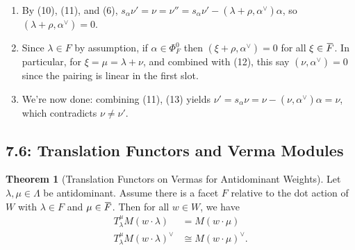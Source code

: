 \documentclass[11pt]{scrartcl}
\theoremstyle{definition}
\theoremstyle{theorem}
\newtheorem{theorem}{Theorem}[section]
\theoremstyle{proof}
\newenvironment{proof}
{\pushQED{$\qed$}\pf}
{\par\popQED\endpf}
\theoremstyle{definition}
\theoremstyle{break}
\theoremstyle{problem}
\newcommand{\dual}[0]{^\vee}
\renewcommand{\bar}[1]{\mkern 1.5mu\overline{\mkern-1.5mu#1\mkern-1.5mu}\mkern 1.5mu}
\renewcommand{\qed}[0]{\hfill\blacksquare}
\begin{document}
\begin{proof}
\begin{enumerate}
  \(s_\alpha \nu ' \leq \nu < \nu'\) where the inequality is strict
  because they are not equal. This is still an \(\alpha\) root string of
  weights in the simple module \(L(\tilde \nu)\) with
  \(\nu \in W\tilde \nu\). The first inequality can \emph{not} be
  strict, otherwise \(v\pm \alpha\) would both be weights of
  \(L(\tilde \nu)\), contradicting Humphreys 1.6 bullet 1. So
  \(s_\alpha \nu' = \nu\).
\item
  By (10), (11), and (6),
  \(s_\alpha \nu' = \nu = \nu'' = s_\alpha \nu ' - (\lambda + \rho, \alpha\dual) \alpha\),
  so \((\lambda + \rho, \alpha\dual) = 0\).
\item
  Since \(\lambda \in F\) by assumption, if \(\alpha \in \Phi_F^0\) then
  \((\xi + \rho, \alpha\dual) = 0\) for all \(\xi \in \bar F\). In
  particular, for \(\xi = \mu = \lambda + \nu\), and combined with (12),
  this say \((\nu, \alpha\dual) = 0\) since the pairing is linear in the
  first slot.
\item
  We're now done: combining (11), (13) yields
  \(\nu ' = s_\alpha \nu = \nu - (\nu, \alpha\dual)\alpha = \nu\), which
  contradicts \(\nu \neq \nu'\).
\end{enumerate}

\end{proof}

\hypertarget{translation-functors-and-verma-modules}{%
\subsection{7.6: Translation Functors and Verma
Modules}\label{translation-functors-and-verma-modules}}

\begin{theorem}[Translation Functors on Vermas for Antidominant Weights]

Let \(\lambda, \mu \in \Lambda\) be antidominant. Assume there is a
facet \(F\) relative to the dot action of \(W\) with \(\lambda \in F\)
and \(\mu \in \bar F\). Then for all \(w\in W\), we have \begin{align*}
T_\lambda^\mu M(w\cdot \lambda) &= M(w\cdot \mu) \\
T_\lambda^\mu M(w\cdot \lambda)\dual &\cong M(w\cdot \mu)\dual
.\end{align*}\end{theorem}
\end{document}
